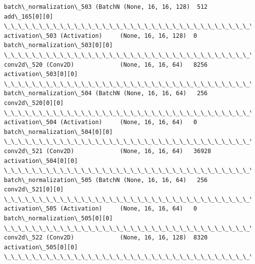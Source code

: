 \documentclass[11pt]{article}
\begin{document}
\begin{Verbatim}[commandchars=\\\{\}]
batch\_normalization\_503 (BatchN (None, 16, 16, 128)  512         add\_165[0][0]                    
\_\_\_\_\_\_\_\_\_\_\_\_\_\_\_\_\_\_\_\_\_\_\_\_\_\_\_\_\_\_\_\_\_\_\_\_\_\_\_\_\_\_\_\_\_\_\_\_\_\_\_\_\_\_\_\_\_\_\_\_\_\_\_\_\_\_\_\_\_\_\_\_\_\_\_\_\_\_\_\_\_\_\_\_\_\_\_\_\_\_\_\_\_\_\_\_\_\_
activation\_503 (Activation)     (None, 16, 16, 128)  0           batch\_normalization\_503[0][0]    
\_\_\_\_\_\_\_\_\_\_\_\_\_\_\_\_\_\_\_\_\_\_\_\_\_\_\_\_\_\_\_\_\_\_\_\_\_\_\_\_\_\_\_\_\_\_\_\_\_\_\_\_\_\_\_\_\_\_\_\_\_\_\_\_\_\_\_\_\_\_\_\_\_\_\_\_\_\_\_\_\_\_\_\_\_\_\_\_\_\_\_\_\_\_\_\_\_\_
conv2d\_520 (Conv2D)             (None, 16, 16, 64)   8256        activation\_503[0][0]             
\_\_\_\_\_\_\_\_\_\_\_\_\_\_\_\_\_\_\_\_\_\_\_\_\_\_\_\_\_\_\_\_\_\_\_\_\_\_\_\_\_\_\_\_\_\_\_\_\_\_\_\_\_\_\_\_\_\_\_\_\_\_\_\_\_\_\_\_\_\_\_\_\_\_\_\_\_\_\_\_\_\_\_\_\_\_\_\_\_\_\_\_\_\_\_\_\_\_
batch\_normalization\_504 (BatchN (None, 16, 16, 64)   256         conv2d\_520[0][0]                 
\_\_\_\_\_\_\_\_\_\_\_\_\_\_\_\_\_\_\_\_\_\_\_\_\_\_\_\_\_\_\_\_\_\_\_\_\_\_\_\_\_\_\_\_\_\_\_\_\_\_\_\_\_\_\_\_\_\_\_\_\_\_\_\_\_\_\_\_\_\_\_\_\_\_\_\_\_\_\_\_\_\_\_\_\_\_\_\_\_\_\_\_\_\_\_\_\_\_
activation\_504 (Activation)     (None, 16, 16, 64)   0           batch\_normalization\_504[0][0]    
\_\_\_\_\_\_\_\_\_\_\_\_\_\_\_\_\_\_\_\_\_\_\_\_\_\_\_\_\_\_\_\_\_\_\_\_\_\_\_\_\_\_\_\_\_\_\_\_\_\_\_\_\_\_\_\_\_\_\_\_\_\_\_\_\_\_\_\_\_\_\_\_\_\_\_\_\_\_\_\_\_\_\_\_\_\_\_\_\_\_\_\_\_\_\_\_\_\_
conv2d\_521 (Conv2D)             (None, 16, 16, 64)   36928       activation\_504[0][0]             
\_\_\_\_\_\_\_\_\_\_\_\_\_\_\_\_\_\_\_\_\_\_\_\_\_\_\_\_\_\_\_\_\_\_\_\_\_\_\_\_\_\_\_\_\_\_\_\_\_\_\_\_\_\_\_\_\_\_\_\_\_\_\_\_\_\_\_\_\_\_\_\_\_\_\_\_\_\_\_\_\_\_\_\_\_\_\_\_\_\_\_\_\_\_\_\_\_\_
batch\_normalization\_505 (BatchN (None, 16, 16, 64)   256         conv2d\_521[0][0]                 
\_\_\_\_\_\_\_\_\_\_\_\_\_\_\_\_\_\_\_\_\_\_\_\_\_\_\_\_\_\_\_\_\_\_\_\_\_\_\_\_\_\_\_\_\_\_\_\_\_\_\_\_\_\_\_\_\_\_\_\_\_\_\_\_\_\_\_\_\_\_\_\_\_\_\_\_\_\_\_\_\_\_\_\_\_\_\_\_\_\_\_\_\_\_\_\_\_\_
activation\_505 (Activation)     (None, 16, 16, 64)   0           batch\_normalization\_505[0][0]    
\_\_\_\_\_\_\_\_\_\_\_\_\_\_\_\_\_\_\_\_\_\_\_\_\_\_\_\_\_\_\_\_\_\_\_\_\_\_\_\_\_\_\_\_\_\_\_\_\_\_\_\_\_\_\_\_\_\_\_\_\_\_\_\_\_\_\_\_\_\_\_\_\_\_\_\_\_\_\_\_\_\_\_\_\_\_\_\_\_\_\_\_\_\_\_\_\_\_
conv2d\_522 (Conv2D)             (None, 16, 16, 128)  8320        activation\_505[0][0]             
\_\_\_\_\_\_\_\_\_\_\_\_\_\_\_\_\_\_\_\_\_\_\_\_\_\_\_\_\_\_\_\_\_\_\_\_\_\_\_\_\_\_\_\_\_\_\_\_\_\_\_\_\_\_\_\_\_\_\_\_\_\_\_\_\_\_\_\_\_\_\_\_\_\_\_\_\_\_\_\_\_\_\_\_\_\_\_\_\_\_\_\_\_\_\_\_\_\_

\end{Verbatim}
\end{document}
